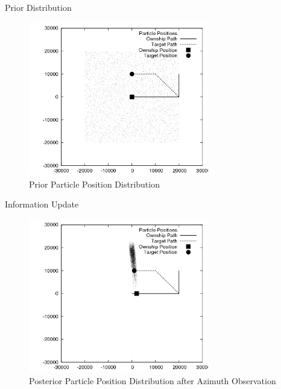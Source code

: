 \documentclass{beamer}
\begin{document}


\begin{frame}{Prior Distribution}

\begin{figure}
\centering
\includegraphics[width=0.7\textwidth]{data/particles_prior.png}
\caption{Prior Particle Position Distribution}
\end{figure}

\end{frame}




\begin{frame}{Information Update}

\begin{figure}
\centering
\includegraphics[width=0.7\textwidth]{data/particles_azimuth_obs.png}
\caption{Posterior Particle Position Distribution after Azimuth Observation}
\end{figure}

\end{frame}
\end{document}
